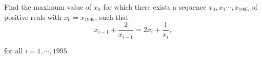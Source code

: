 Find the maximum value of $ x_{0}$ for which there exists a sequence $ x_{0},x_{1}\cdots ,x_{1995}$ of positive reals with $ x_{0} = x_{1995}$,  such that\[ x_{i - 1} + \frac {2}{x_{i - 1}} = 2x_{i} + \frac {1}{x_{i}},
\]

for all $ i = 1,\cdots ,1995$.
